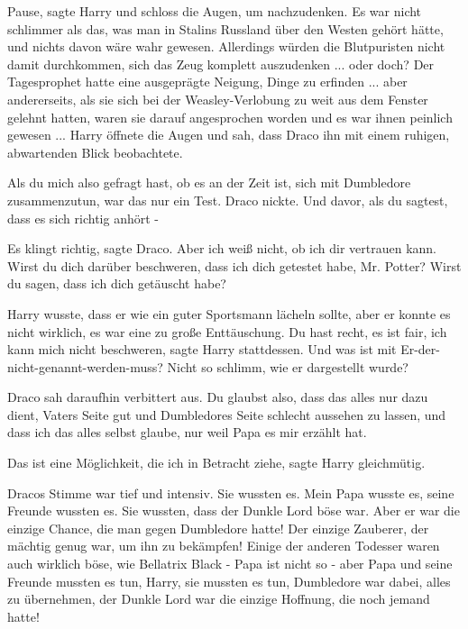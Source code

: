\glqq{}Pause\grqq{}, sagte Harry und schloss die Augen, um nachzudenken. Es war
nicht schlimmer als das, was man in Stalins Russland über den Westen gehört
hätte, und nichts davon wäre wahr gewesen. Allerdings würden die Blutpuristen
nicht damit durchkommen, sich das Zeug komplett auszudenken ... oder doch? Der
Tagesprophet hatte eine ausgeprägte Neigung, Dinge zu erfinden ... aber
andererseits, als sie sich bei der Weasley-Verlobung zu weit aus dem Fenster
gelehnt hatten, waren sie darauf angesprochen worden und es war ihnen peinlich
gewesen ... Harry öffnete die Augen und sah, dass Draco ihn mit einem ruhigen,
abwartenden Blick beobachtete.

\glqq{}Als du mich also gefragt hast, ob es an der Zeit ist, sich mit Dumbledore
zusammenzutun, war das nur ein Test.\grqq{} Draco nickte. \glqq{}Und davor, als
du sagtest, dass es sich richtig anhört -\grqq{}

\glqq{}Es klingt richtig\grqq{}, sagte Draco. \glqq{}Aber ich weiß nicht, ob ich
dir vertrauen kann. Wirst du dich darüber beschweren, dass ich dich getestet
habe, Mr. Potter? Wirst du sagen, dass ich dich getäuscht habe?\grqq{}

Harry wusste, dass er wie ein guter Sportsmann lächeln sollte, aber er konnte es
nicht wirklich, es war eine zu große Enttäuschung. \glqq{}Du hast recht, es ist
fair, ich kann mich nicht beschweren\grqq{}, sagte Harry stattdessen. \glqq{}Und
was ist mit Er-der-nicht-genannt-werden-muss? Nicht so schlimm, wie er
dargestellt wurde?\grqq{}

Draco sah daraufhin verbittert aus. \glqq{}Du glaubst also, dass das alles nur
dazu dient, Vaters Seite gut und Dumbledores Seite schlecht aussehen zu lassen,
und dass ich das alles selbst glaube, nur weil Papa es mir erzählt hat.\grqq{}

\glqq{}Das ist eine Möglichkeit, die ich in Betracht ziehe\grqq{}, sagte Harry
gleichmütig.

Dracos Stimme war tief und intensiv. \glqq{}Sie wussten es. Mein Papa wusste es,
seine Freunde wussten es. Sie wussten, dass der Dunkle Lord böse war. Aber er
war die einzige Chance, die man gegen Dumbledore hatte! Der einzige Zauberer,
der mächtig genug war, um ihn zu bekämpfen! Einige der anderen Todesser waren
auch wirklich böse, wie Bellatrix Black - Papa ist nicht so - aber Papa und
seine Freunde mussten es tun, Harry, sie mussten es tun, Dumbledore war dabei,
alles zu übernehmen, der Dunkle Lord war die einzige Hoffnung, die noch jemand
hatte!\grqq{}

